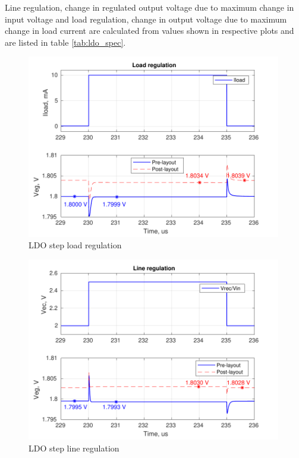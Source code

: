 \documentclass[12pt,a4paper,UKenglish]{report}
\begin{document}
 Line regulation, change in regulated output voltage due to maximum change in input voltage and load regulation, change in output voltage due to maximum change in load current are calculated from values shown in respective plots and are listed in table \ref{tab:ldo_spec}.

\begin{figure}[!htb] %
   \centering
   \includegraphics[width=0.99\textwidth]{img/ldo_loadr_both.pdf} 
   \caption{LDO step load regulation}
   \label{fig:ldo_loadr}
\end{figure}

\begin{figure}[H] %
   \centering
   \includegraphics[width=0.99\textwidth]{img/ldo_liner_both.pdf} 
   \caption{LDO step line regulation}
   \label{fig:ldo_liner}
\end{figure}
\end{document}
